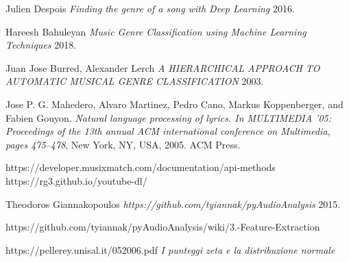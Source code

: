 \documentclass[%
 reprint,
 amsmath,amssymb,
 aps,
 article,
]{revtex4-1}
\begin{document}
\begin{thebibliography}{1}

   Julien Despois {\em Finding the genre of a song with Deep Learning}  2016.
 
   Hareesh Bahuleyan {\em Music Genre Classification using Machine Learning Techniques} 2018.
 
   Juan Jose Burred, Alexander Lerch {\em  A HIERARCHICAL APPROACH TO
AUTOMATIC MUSICAL GENRE CLASSIFICATION} 2003.

    Jose P. G. Mahedero, Alvaro Martinez, Pedro Cano, Markus Koppenberger, and
Fabien Gouyon.  {\em Natural language processing of lyrics. In MULTIMEDIA ’05:
Proceedings of the 13th annual ACM international conference on Multimedia, pages
475–478}, New York, NY, USA, 2005. ACM Press.

 https://developer.musixmatch.com/documentation/api-methods
 https://rg3.github.io/youtube-dl/

 Theodoros Giannakopoulos {\em https://github.com/tyiannak/pyAudioAnalysis} 2015.

 https://github.com/tyiannak/pyAudioAnalysis/wiki/3.-Feature-Extraction

 https://pellerey.unisal.it/052006.pdf {\em I punteggi zeta e la distribuzione normale}


  \end{thebibliography}
\end{document}
